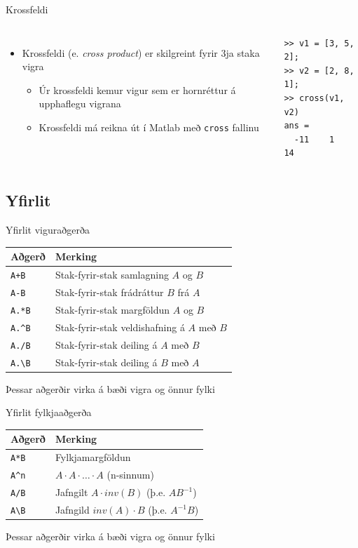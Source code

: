 \documentclass[handout]{beamer}
\begin{document}
\begin{frame}[fragile]{Krossfeldi}
\begin{columns}
\begin{itemize}
 \item Krossfeldi (e. \emph{cross product}) er skilgreint fyrir 3ja staka vigra
 \begin{itemize}
  \item Úr krossfeldi kemur vigur sem er hornréttur á upphaflegu vigrana
  \item Krossfeldi má reikna út í Matlab með \texttt{cross} fallinu
 \end{itemize}
\end{itemize}
\begin{verbatim}
>> v1 = [3, 5, 2];
>> v2 = [2, 8, 1];
>> cross(v1, v2)
ans =
  -11    1   14
\end{verbatim}
\end{columns}
\end{frame}

\subsection{Yfirlit}

\begin{frame}{Yfirlit viguraðgerða}
\begin{center}
\begin{tabular}{ll}
\toprule
Aðgerð&Merking\\
\midrule
\texttt{A+B}&Stak-fyrir-stak samlagning $A$ og $B$\\
\texttt{A-B}&Stak-fyrir-stak frádráttur $B$ frá $A$\\
\texttt{A.*B}&Stak-fyrir-stak margföldun $A$ og $B$\\
\texttt{A.\^{}B}&Stak-fyrir-stak veldishafning á $A$ með $B$\\
\texttt{A./B}&Stak-fyrir-stak deiling á $A$ með $B$\\
\texttt{A.\textbackslash B}&Stak-fyrir-stak deiling á $B$ með $A$\\
\bottomrule
\end{tabular}
\end{center}
Þessar aðgerðir virka á bæði vigra og önnur fylki
\end{frame}

\begin{frame}{Yfirlit fylkjaaðgerða}
\begin{center}
\begin{tabular}{ll}
\toprule
Aðgerð&Merking\\
\midrule
\texttt{A*B}&Fylkjamargföldun\\
\texttt{A\^{}n}&$A\cdot A\cdot \ldots \cdot A$ (n-sinnum)\\
\texttt{A/B}&Jafngilt  $A\cdot inv(B)$ (þ.e. $AB^{-1}$)\\
\texttt{A\textbackslash B}&Jafngild $inv(A)\cdot B$  (þ.e. $A^{-1}B$)\\
\bottomrule
\end{tabular}
\end{center}
Þessar aðgerðir virka á bæði vigra og önnur fylki
\end{frame}
\end{document}
